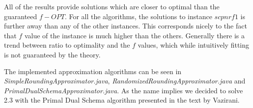 All of the results provide solutions which are closer to optimal than the guaranteed $f-OPT$. For all the algorithms, the solutions to instance $scpnrf1$ is further away than any of the other instances. This corresponds nicely to the fact that $f$ value of the instance is much higher than the others. Generally there is a trend between ratio to optimality and the $f$ values, which while intuitively fitting is not guaranteed by the theory.

The implemented approximation algorithms can be seen in \textit{SimpleRoundingApproximator.java}, \textit{RandomizedRoundingApproximator.java} and \textit{PrimalDualSchemaApproximator.java}. As the name implies we decided to solve 2.3 with the Primal Dual Schema algorithm presented in the text by Vazirani.
